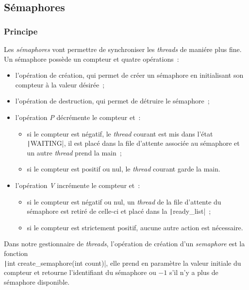 \documentclass[a4paper]{article}
\begin{document}
\subsection{Sémaphores}

\subsubsection{Principe}

Les \emph{sémaphores} vont permettre de synchroniser les \emph{threads} de maniére plus fine. Un sémaphore possède un compteur et quatre opérations~:\\

\begin{itemize}

\item l'opération de création, qui permet de créer un sémaphore en initialisant son compteur à la valeur désirée~;\\

\item l'opération de destruction, qui permet de détruire le sémaphore~;\\

\item l'opération \emph{P} décrémente le compteur et~:
\begin{itemize}
\item si le compteur est négatif, le \emph{thread} courant est mis dans l'état \texttt|WAITING|, il est placé dans la file d'attente associée au
sémaphore et un autre \emph{thread} prend la main~;
\item si le compteur est positif ou nul, le \emph{thread} courant garde la main.\\
\end{itemize}

\item l'opération \emph{V} incrémente le compteur et~:
\begin{itemize}
\item si le compteur est négatif ou nul, un \emph{thread} de la file d'attente du sémaphore est retiré de celle-ci et placé dans
la \texttt|ready_list|~;
\item si le compteur est strictement positif, aucune autre action est nécessaire.\\
\end{itemize} 

\end{itemize}

Dans notre gestionnaire de \emph{threads}, l'opération de création d'un \emph{semaphore} est la fonction \\
\texttt|int create_semaphore(int count)|,
elle prend en paramètre la valeur initiale du compteur et retourne l'identifiant du sémaphore ou $-1$ s'il n'y a plus de sémaphore disponible.\\
\end{document}
